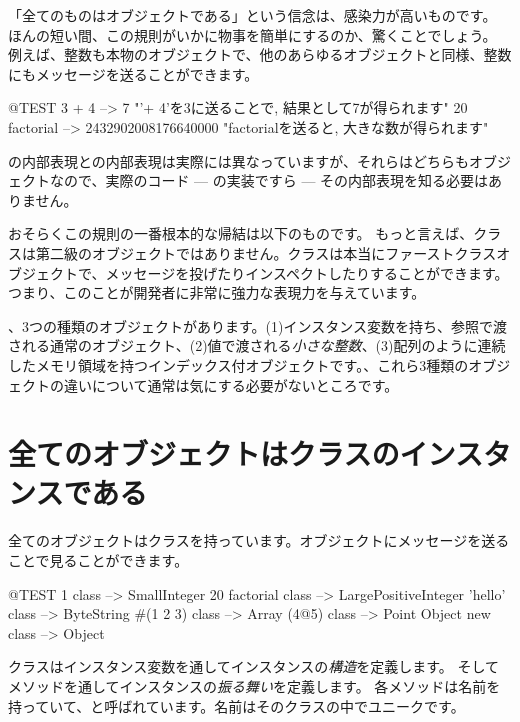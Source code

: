 \documentclass[a4paper,10pt,twoside]{book}
\begin{document}

「全てのものはオブジェクトである」という信念は、感染力が高いものです。
ほんの短い間、この規則がいかに物事を簡単にするのか、驚くことでしょう。
例えば、整数も本物のオブジェクトで、他のあらゆるオブジェクトと同様、整数にもメッセージを送ることができます。

\begin{code}{@TEST}
3 + 4            --> 7    "'+ 4'を3に送ることで, 結果として7が得られます"
20 factorial  --> 2432902008176640000   "factorialを送ると, 大きな数が得られます"
\end{code}

の内部表現との内部表現は実際には異なっていますが、それらはどちらもオブジェクトなので、実際のコード --- の実装ですら --- その内部表現を知る必要はありません。

おそらくこの規則の一番根本的な帰結は以下のものです。
もっと言えば、クラスは第二級のオブジェクトではありません。クラスは本当にファーストクラスオブジェクトで、メッセージを投げたりインスペクトしたりすることができます。
つまり、このことが開発者に非常に強力な表現力を与えています。

、3つの種類のオブジェクトがあります。(1)インスタンス変数を持ち、参照で渡される通常のオブジェクト、(2)値で渡される\emph{小さな整数}、(3)配列のように連続したメモリ領域を持つインデックス付オブジェクトです。、これら3種類のオブジェクトの違いについて通常は気にする必要がないところです。

\section{全てのオブジェクトはクラスのインスタンスである}


全てのオブジェクトはクラスを持っています。オブジェクトにメッセージを送ることで見ることができます。

\begin{code}{@TEST}
1 class                 --> SmallInteger
20 factorial class --> LargePositiveInteger
'hello' class          --> ByteString
#(1 2 3) class       --> Array
(4@5) class         --> Point
Object new class --> Object
\end{code}

クラスはインスタンス変数を通してインスタンスの\emph{構造}を定義します。
そしてメソッドを通してインスタンスの\emph{振る舞い}を定義します。
各メソッドは名前を持っていて、と呼ばれています。名前はそのクラスの中でユニークです。
\end{document}
